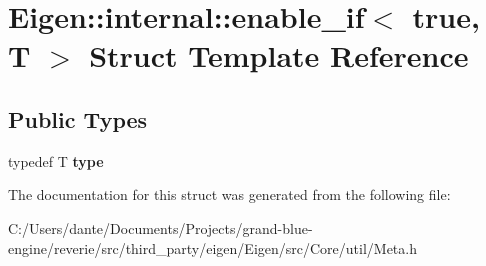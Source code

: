 \hypertarget{struct_eigen_1_1internal_1_1enable__if_3_01true_00_01_t_01_4}{}\section{Eigen\+::internal\+::enable\+\_\+if$<$ true, T $>$ Struct Template Reference}
\label{struct_eigen_1_1internal_1_1enable__if_3_01true_00_01_t_01_4}
\subsection*{Public Types}
\begin{DoxyCompactItemize}
\item 
\mbox{\label{struct_eigen_1_1internal_1_1enable__if_3_01true_00_01_t_01_4_aa36ae7c40deeb800cb3580c221870742}} 
typedef T {\bfseries type}
\end{DoxyCompactItemize}


The documentation for this struct was generated from the following file\+:\begin{DoxyCompactItemize}
\item 
C\+:/\+Users/dante/\+Documents/\+Projects/grand-\/blue-\/engine/reverie/src/third\+\_\+party/eigen/\+Eigen/src/\+Core/util/Meta.\+h\end{DoxyCompactItemize}
